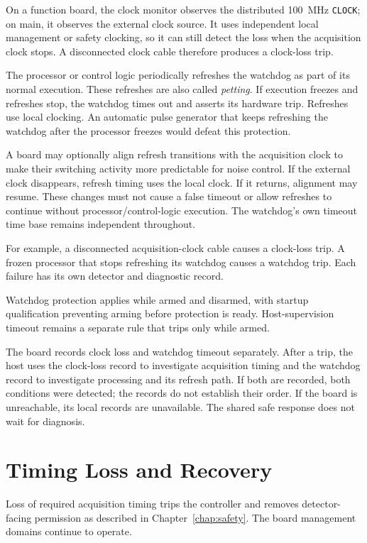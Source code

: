 On a function board, the clock monitor observes the distributed 100~MHz \texttt{CLOCK}; on main, it observes the external clock source. It uses independent local management or safety clocking, so it can still detect the loss when the acquisition clock stops. A disconnected clock cable therefore produces a clock-loss trip.

The processor or control logic periodically refreshes the watchdog as part of its normal execution. These refreshes are also called \emph{petting}. If execution freezes and refreshes stop, the watchdog times out and asserts its hardware trip. Refreshes use local clocking. An automatic pulse generator that keeps refreshing the watchdog after the processor freezes would defeat this protection.

A board may optionally align refresh transitions with the acquisition clock to make their switching activity more predictable for noise control. If the external clock disappears, refresh timing uses the local clock. If it returns, alignment may resume. These changes must not cause a false timeout or allow refreshes to continue without processor/control-logic execution. The watchdog's own timeout time base remains independent throughout.

For example, a disconnected acquisition-clock cable causes a clock-loss trip. A frozen processor that stops refreshing its watchdog causes a watchdog trip. Each failure has its own detector and diagnostic record.

Watchdog protection applies while armed and disarmed, with startup qualification preventing arming before protection is ready. Host-supervision timeout remains a separate rule that trips only while armed.

The board records clock loss and watchdog timeout separately. After a trip, the host uses the clock-loss record to investigate acquisition timing and the watchdog record to investigate processing and its refresh path. If both are recorded, both conditions were detected; the records do not establish their order. If the board is unreachable, its local records are unavailable. The shared safe response does not wait for diagnosis.

\section{Timing Loss and Recovery}

Loss of required acquisition timing trips the controller and removes detector-facing permission as described in Chapter~\ref{chap:safety}. The board management domains continue to operate.

